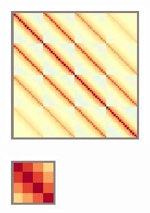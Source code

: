 \begin{figure}
\begin{subfigure}{\textwidth/4}
      \caption{}
    \end{subfigure}\hfill%
    \begin{subfigure}{\textwidth/4}
		  \includegraphics[width=\linewidth]{figures/stbf_struct/covs-2.eps}
      \caption{}
    \end{subfigure}\hfill%
    \begin{minipage}[b]{\textwidth/10}
      \begin{subfigure}{\textwidth}
  		  \includegraphics[width=\linewidth]{figures/stbf_struct/covs-6.eps}

\end{subfigure}
\end{minipage}
\end{figure}
